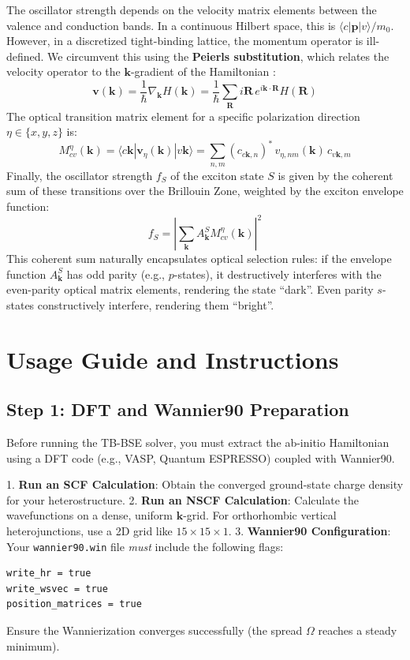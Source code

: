 \documentclass[11pt, a4paper]{article}
\begin{document}
The oscillator strength depends on the velocity matrix elements between the valence and conduction bands. In a continuous Hilbert space, this is $\langle c | \mathbf{p} | v \rangle / m_0$. However, in a discretized tight-binding lattice, the momentum operator is ill-defined. We circumvent this using the \textbf{Peierls substitution}, which relates the velocity operator to the $\mathbf{k}$-gradient of the Hamiltonian \cite{boykin2010}:
\begin{equation}
    \mathbf{v}(\mathbf{k}) = \frac{1}{\hbar} \nabla_{\mathbf{k}} H(\mathbf{k}) = \frac{1}{\hbar} \sum_{\mathbf{R}} i\mathbf{R} \, e^{i \mathbf{k} \cdot \mathbf{R}} H(\mathbf{R})
\end{equation}
The optical transition matrix element for a specific polarization direction $\eta \in \{x,y,z\}$ is:
\begin{equation}
    M_{cv}^{\eta}(\mathbf{k}) = \langle c\mathbf{k} | \mathbf{v}_{\eta}(\mathbf{k}) | v\mathbf{k} \rangle = \sum_{n,m} (c_{c\mathbf{k},n})^* \, v_{\eta, nm}(\mathbf{k}) \, c_{v\mathbf{k},m}
\end{equation}
Finally, the oscillator strength $f_S$ of the exciton state $S$ is given by the coherent sum of these transitions over the Brillouin Zone, weighted by the exciton envelope function:
\begin{equation}
    f_S = \left| \sum_{\mathbf{k}} A_{\mathbf{k}}^S M_{cv}^{\eta}(\mathbf{k}) \right|^2
\end{equation}
This coherent sum naturally encapsulates optical selection rules: if the envelope function $A_{\mathbf{k}}^S$ has odd parity (e.g., $p$-states), it destructively interferes with the even-parity optical matrix elements, rendering the state ``dark''. Even parity $s$-states constructively interfere, rendering them ``bright''.

\newpage
\section{Usage Guide and Instructions}

\subsection{Step 1: DFT and Wannier90 Preparation}
Before running the TB-BSE solver, you must extract the ab-initio Hamiltonian using a DFT code (e.g., VASP, Quantum ESPRESSO) coupled with Wannier90.

1. \textbf{Run an SCF Calculation}: Obtain the converged ground-state charge density for your heterostructure.
2. \textbf{Run an NSCF Calculation}: Calculate the wavefunctions on a dense, uniform $\mathbf{k}$-grid. For orthorhombic vertical heterojunctions, use a 2D grid like $15 \times 15 \times 1$. 
3. \textbf{Wannier90 Configuration}: Your \texttt{wannier90.win} file \textit{must} include the following flags:
\begin{verbatim}
write_hr = true
write_wsvec = true
position_matrices = true
\end{verbatim}
Ensure the Wannierization converges successfully (the spread $\Omega$ reaches a steady minimum).
\end{document}
